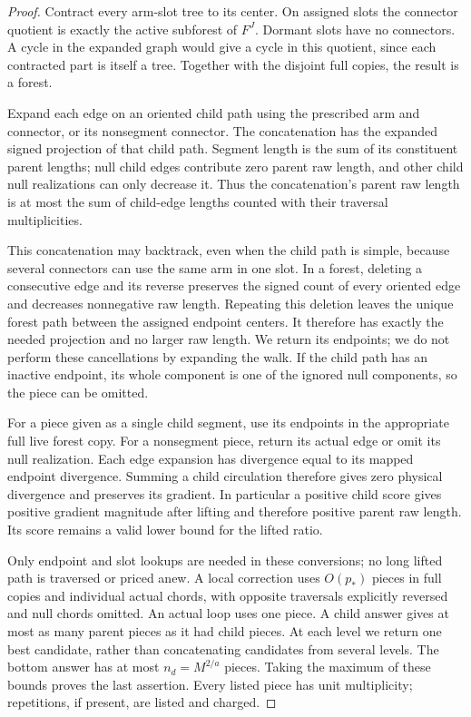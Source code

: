 \begin{proof}
Contract every arm-slot tree to its center.  On assigned slots the
connector quotient is exactly the active subforest of $F^J$.
Dormant slots have no connectors.  A cycle in the expanded graph
would give a cycle in this quotient, since each contracted part is
itself a tree.  Together with the disjoint full copies, the result
is a forest.

Expand each edge on an oriented child path using the prescribed
arm and connector, or its nonsegment connector.  The concatenation
has the expanded signed projection of that child path.  Segment
length is the sum of its constituent parent lengths; null child
edges contribute zero parent raw length, and other child null
realizations can only decrease it.  Thus the concatenation's
parent raw length is at most the sum of child-edge lengths counted
with their traversal multiplicities.

This concatenation may backtrack, even when the child path is
simple, because several connectors can use the same arm in one
slot.  In a forest, deleting a consecutive edge and its reverse
preserves the signed count of every oriented edge and decreases
nonnegative raw length.  Repeating this deletion leaves the unique
forest path between the assigned endpoint centers.  It therefore
has exactly the needed projection and no larger raw length.  We
return its endpoints; we do not perform these cancellations by
expanding the walk.  If the child path has an inactive endpoint,
its whole component is one of the ignored null components, so the
piece can be omitted.

For a piece given as a single child segment, use its endpoints in
the appropriate full live forest copy.  For a nonsegment piece,
return its actual edge or omit its null realization.  Each edge
expansion has divergence equal to its mapped endpoint divergence.
Summing a child circulation therefore gives zero physical
divergence and preserves its gradient.  In particular a positive
child score gives positive gradient magnitude after lifting and
therefore positive parent raw length.  Its score remains a valid
lower bound for the lifted ratio.

Only endpoint and slot lookups are needed in these conversions;
no long lifted path is traversed or priced anew.  A local correction
uses $O(p_*)$ pieces in full copies and individual actual chords,
with opposite traversals explicitly reversed and null chords
omitted.  An actual loop uses one piece.  A child answer gives at
most as many parent pieces as it had child pieces.  At each level
we return one best candidate, rather than concatenating candidates
from several levels.  The bottom answer has at most
$n_d=M^{2/a}$ pieces.  Taking the maximum of these bounds proves the
last assertion.  Every listed piece has unit multiplicity;
repetitions, if present, are listed and charged.
\end{proof}

